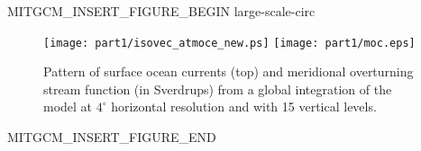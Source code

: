 \begin{rawhtml}MITGCM_INSERT_FIGURE_BEGIN large-scale-circ\end{rawhtml}
\begin{figure}
\begin{center}
 \texttt{[image: part1/isovec\_atmoce\_new.ps]}
 \texttt{[image: part1/moc.eps]}
\end{center}
\caption{Pattern of surface ocean currents (top) and meridional
overturning stream function (in Sverdrups) from a global
integration of the model at $4^{\circ}$ horizontal resolution and with
15 vertical levels.}
\label{fig:large-scale-circ}
\end{figure}
\begin{rawhtml}MITGCM_INSERT_FIGURE_END\end{rawhtml}
